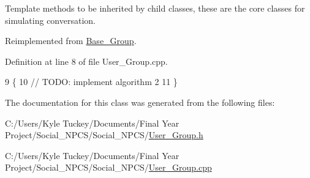 Template methods to be inherited by child classes, these are the core classes for simulating conversation. 



Reimplemented from \hyperlink{class_base___group_aa5080b6388c5974394bf326ce80bfa91}{Base\+\_\+\+Group}.



Definition at line 8 of file User\+\_\+\+Group.\+cpp.


\begin{DoxyCode}
9 \{
10     \textcolor{comment}{// TODO: implement algorithm 2}
11 \}
\end{DoxyCode}


The documentation for this class was generated from the following files\+:\begin{DoxyCompactItemize}
\item 
C\+:/\+Users/\+Kyle Tuckey/\+Documents/\+Final Year Project/\+Social\+\_\+\+N\+P\+C\+S/\+Social\+\_\+\+N\+P\+C\+S/\hyperlink{_user___group_8h}{User\+\_\+\+Group.\+h}\item 
C\+:/\+Users/\+Kyle Tuckey/\+Documents/\+Final Year Project/\+Social\+\_\+\+N\+P\+C\+S/\+Social\+\_\+\+N\+P\+C\+S/\hyperlink{_user___group_8cpp}{User\+\_\+\+Group.\+cpp}\end{DoxyCompactItemize}
